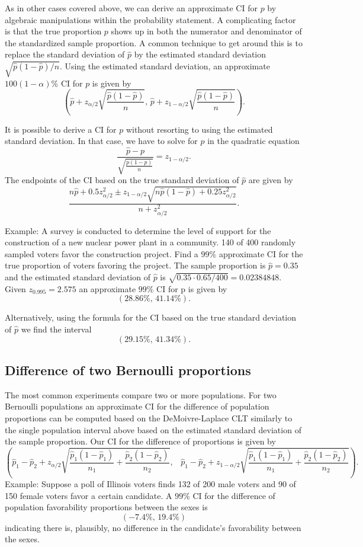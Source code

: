 \documentclass[]{book}
\begin{document}
As in other cases covered above, we can derive an approximate CI for
\(p\) by algebraic manipulations within the probability statement. A
complicating factor is that the true proportion \(p\) shows up in both
the numerator and denominator of the standardized sample proportion. A
common technique to get around this is to replace the standard deviation
of \(\hat p\) by the estimated standard deviation
\(\sqrt{\hat p(1-\hat p)/n}\). Using the estimated standard deviation,
an approximate \(100(1-\alpha)\%\) CI for \(p\) is given by
\[\left(\hat p + z_{\alpha/2}\sqrt{\frac{\hat p(1-\hat p)}{n}}, \, \hat p + z_{1-\alpha/2}\sqrt{\frac{\hat p(1-\hat p)}{n}}\right).\]

It is possible to derive a CI for \(p\) without resorting to using the
estimated standard deviation. In that case, we have to solve for \(p\)
in the quadratic equation
\[\frac{\hat p - p}{\sqrt{\frac{p(1-p)}{n}}}= z_{1-\alpha/2}.\] The
endpoints of the CI based on the true standard deviation of \(\hat p\)
are given by
\[\frac{n\hat p + 0.5z_{\alpha/2}^2\pm z_{1-\alpha/2}\sqrt{n\hat p(1-\hat p)+0.25z_{\alpha/2}^2}}{n+z_{\alpha/2}^2}.\]

 Example: A survey is conducted to determine the level of support for
the construction of a new nuclear power plant in a community. 140 of 400
randomly sampled voters favor the construction project. Find a \(99\%\)
approximate CI for the true proportion of voters favoring the project.
The sample proportion is \(\hat p = 0.35\) and the estimated standard
deviation of \(\hat p\) is \(\sqrt{0.35\cdot 0.65 / 400} = 0.02384848\).
Given \(z_{0.995} = 2.575\) an approximate \(99\%\) CI for p is given by
\[(28.86\%, \, 41.14\%).\]

Alternatively, using the formula for the CI based on the true standard
deviation of \(\hat p\) we find the interval \[(29.15\%, \, 41.34\%).\]

\subsection{Difference of two Bernoulli
proportions}\label{difference-of-two-bernoulli-proportions}

The most common experiments compare two or more populations. For two
Bernoulli populations an approximate CI for the difference of population
proportions can be computed based on the DeMoivre-Laplace CLT similarly
to the single population interval above based on the estimated standard
deviation of the sample proportion. Our CI for the difference of
proportions is given by
\[\left(\hat p_1 - \hat p_2 + z_{\alpha/2}\sqrt{\frac{\hat p_1(1-\hat p_1)}{n_1} + \frac{\hat p_2(1-\hat p_2)}{n_2}}, \,\,\,\,\, \hat p_1 - \hat p_2 + z_{1-\alpha/2}\sqrt{\frac{\hat p_1(1-\hat p_1)}{n_1} + \frac{\hat p_2(1-\hat p_2)}{n_2}}\right).\]
Example: Suppose a poll of Illinois voters finds 132 of 200 male voters
and 90 of 150 female voters favor a certain candidate. A \(99\%\) CI for
the difference of population favorability proportions between the sexes
is \[(-7.4\%, \, 19.4\%)\] indicating there is, plausibly, no difference
in the candidate's favorability between the sexes.
\end{document}
